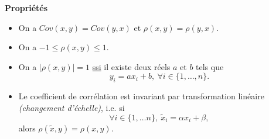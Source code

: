 \documentclass[aspectratio=169,xcolor=dvipsnames]{beamer}
\begin{document}
\begin{frame}
	\begin{alertblock}{\textbf{Propriétés}}
		\begin{itemize}
		\item On a $Cov(x,y) =Cov(y,x)$ et $\rho(x,y) = \rho(y,x)$.
		\item On a $-1 \leqslant \rho(x,y) \leqslant 1$.
		\item On a $ \left| \rho(x,y) \right| = 1$ \underline{ssi} il existe deux réels $a$ et $b$ tels que
		\[y_i=ax_i+b, \ \forall i \in \{1,\ldots,n\}.\]
		\item Le coefficient de corrélation est invariant par transformation linéaire \emph{(changement d'échelle)}, i.e. si 
			\[
			\forall i \in \{1,\ldots n\}, \ \widetilde{x}_i=\alpha x_i + \beta,
			\]
		alors $\rho(\widetilde{x},y) = \rho(x,y)$.
		\end{itemize}
	\end{alertblock}
\end{frame}
\end{document}
